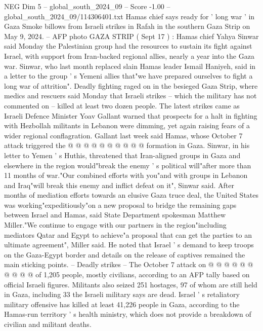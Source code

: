 \begin{textsample}{NEG Dim 5 – global\_south\_2024\_09 – Score -1.00 – global\_south\_2024\_09/114306401.txt}  \label{ex:f5_neg_191}
Hamas chief says ready for ' long war ' in Gaza Smoke billows from Israeli strikes in Rafah in the southern Gaza Strip on May 9, 2024. -- AFP photo GAZA STRIP ( Sept 17 ) : Hamas chief Yahya Sinwar said Monday the Palestinian group had the resources to sustain its fight against Israel, with support from Iran-backed regional allies, nearly a year into the Gaza war.
Sinwar, who last month replaced slain Hamas leader Ismail Haniyeh, said in a letter to the group ' s Yemeni allies that"we have prepared ourselves to fight a long war of attrition".
Deadly fighting raged on in the besieged Gaza Strip, where medics and rescuers said Monday that Israeli strikes -- which the military has not commented on -- killed at least two dozen people.
The latest strikes came as Israeli Defence Minister Yoav Gallant warned that prospects for a halt in fighting with Hezbollah militants in Lebanon were dimming, yet again raising fears of a wider regional conflagration.
Gallant last week said Hamas, whose October 7 attack triggered the @ @ @ @ @ @ @ @ @ @ formation in Gaza.
Sinwar, in his letter to Yemen ' s Huthis, threatened that Iran-aligned groups in Gaza and elsewhere in the region would"break the enemy ' s political will"after more than 11 months of war."Our combined efforts with you"and with groups in Lebanon and Iraq"will break this enemy and inflict defeat on it", Sinwar said.
After months of mediation efforts towards an elusive Gaza truce deal, the United States was working"expeditiously"on a new proposal to bridge the remaining gaps between Israel and Hamas, said State Department spokesman Matthew Miller."We continue to engage with our partners in the region"including mediators Qatar and Egypt to achieve"a proposal that can get the parties to an ultimate agreement", Miller said.
He noted that Israel ' s demand to keep troops on the Gaza-Egypt border and details on the release of captives remained the main sticking points. -- Deadly strikes -- The October 7 attack on @ @ @ @ @ @ @ @ @ @ of 1,205 people, mostly civilians, according to an AFP tally based on official Israeli figures.
Militants also seized 251 hostages, 97 of whom are still held in Gaza, including 33 the Israeli military says are dead.
Israel ' s retaliatory military offensive has killed at least 41,226 people in Gaza, according to the Hamas-run territory ' s health ministry, which does not provide a breakdown of civilian and militant deaths.

\end{textsample}
